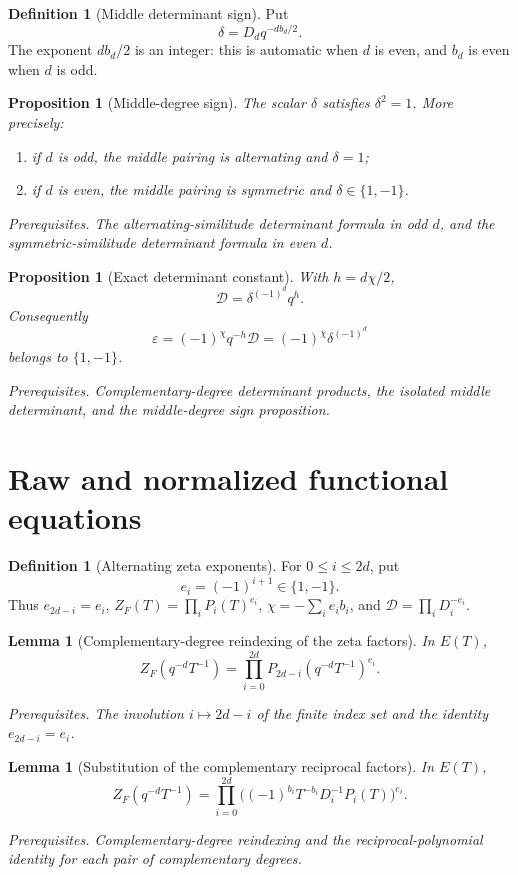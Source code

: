 \documentclass[10pt]{article}
\newtheorem{proposition}[theorem]{Proposition}
\newtheorem{lemma}[theorem]{Lemma}
\theoremstyle{definition}
\newtheorem{definition}[theorem]{Definition}
\newcommand{\deps}[1]{\par\smallskip\noindent\textit{Prerequisites.} #1}
\begin{document}
\begin{definition}[Middle determinant sign]
Put
\[
 \delta=D_dq^{-db_d/2}.
\]
The exponent \(db_d/2\) is an integer: this is automatic when \(d\) is
even, and \(b_d\) is even when \(d\) is odd.
\end{definition}

\begin{proposition}[Middle-degree sign]
The scalar \(\delta\) satisfies \(\delta^2=1\).  More precisely:
\begin{enumerate}[label=\textup{(\roman*)}]
\item if \(d\) is odd, the middle pairing is alternating and \(\delta=1\);
\item if \(d\) is even, the middle pairing is symmetric and
      \(\delta\in\{1,-1\}\).
\end{enumerate}
\deps{The alternating-similitude determinant formula in odd \(d\), and the
symmetric-similitude determinant formula in even \(d\).}
\end{proposition}

\begin{proposition}[Exact determinant constant]
With \(h=d\chi/2\),
\[
 \mathcal D=\delta^{(-1)^d}q^h.
\]
Consequently
\[
 \varepsilon=(-1)^\chi q^{-h}\mathcal D
 =(-1)^\chi\delta^{(-1)^d}
\]
belongs to \(\{1,-1\}\).
\deps{Complementary-degree determinant products, the isolated middle
determinant, and the middle-degree sign proposition.}
\end{proposition}

\section{Raw and normalized functional equations}

\begin{definition}[Alternating zeta exponents]
For \(0\leq i\leq2d\), put
\[
 e_i=(-1)^{i+1}\in\{1,-1\}.
\]
Thus \(e_{2d-i}=e_i\),
\(Z_F(T)=\prod_iP_i(T)^{e_i}\),
\(\chi=-\sum_i e_i b_i\), and
\(\mathcal D=\prod_iD_i^{-e_i}\).
\end{definition}

\begin{lemma}[Complementary-degree reindexing of the zeta factors]
In \(E(T)\),
\[
 Z_F(q^{-d}T^{-1})
 =\prod_{i=0}^{2d}
 P_{2d-i}(q^{-d}T^{-1})^{e_i}.
\]
\deps{The involution \(i\mapsto2d-i\) of the finite index set and the
identity \(e_{2d-i}=e_i\).}
\end{lemma}

\begin{lemma}[Substitution of the complementary reciprocal factors]
In \(E(T)\),
\[
 Z_F(q^{-d}T^{-1})
 =\prod_{i=0}^{2d}
 \bigl((-1)^{b_i}T^{-b_i}D_i^{-1}P_i(T)\bigr)^{e_i}.
\]
\deps{Complementary-degree reindexing and the reciprocal-polynomial
identity for each pair of complementary degrees.}
\end{lemma}
\end{document}
